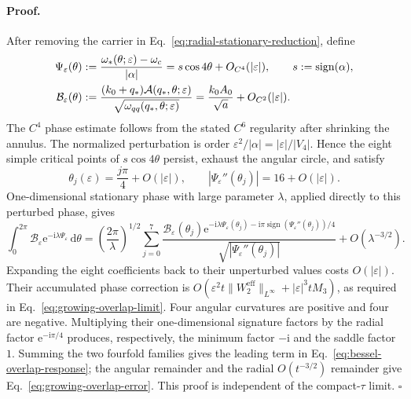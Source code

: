 \paragraph{Proof.}
After removing the carrier in
Eq.~\eqref{eq:radial-stationary-reduction}, define
\begin{align}
  \Psi_\varepsilon(\theta)
  &:=\frac{\omega_*(\theta;\varepsilon)-\omega_c}{|\alpha|}
    =s\cos4\theta+O_{C^4}(|\varepsilon|),
    \qquad s:=\operatorname{sign}(\alpha),                         \notag\\
  \mathcal B_\varepsilon(\theta)
  &:=\frac{(k_0+q_*)\mathcal A(q_*,\theta;\varepsilon)}
          {\sqrt{\omega_{qq}(q_*,\theta;\varepsilon)}}
    =\frac{k_0A_0}{\sqrt a}+O_{C^2}(|\varepsilon|).
  \label{eq:growing-overlap-normalized-data}
\end{align}
The \(C^4\) phase estimate follows from the stated \(C^6\) regularity after
shrinking the annulus.  The normalized perturbation is order
\(\varepsilon^2/|\alpha|=|\varepsilon|/|V_4|\).  Hence the eight simple
critical points of \(s\cos4\theta\) persist, exhaust the angular circle,
and satisfy
\begin{equation}
  \theta_j(\varepsilon)=\frac{j\pi}{4}+O(|\varepsilon|),
  \qquad
  |\Psi_\varepsilon''(\theta_j)|=16+O(|\varepsilon|).
  \label{eq:growing-overlap-critical-data}
\end{equation}
One-dimensional stationary phase with large parameter \(\lambda\), applied
directly to this perturbed phase, gives
\begin{equation}
  \int_0^{2\pi}\mathcal B_\varepsilon
    \mathrm e^{-\mathrm i\lambda\Psi_\varepsilon}\,\mathrm d\theta
  =\left(\frac{2\pi}{\lambda}\right)^{1/2}
    \sum_{j=0}^{7}
    \frac{\mathcal B_\varepsilon(\theta_j)
      \mathrm e^{-\mathrm i\lambda\Psi_\varepsilon(\theta_j)
      -\mathrm i\pi\operatorname{sign}
        (\Psi_\varepsilon''(\theta_j))/4}}
         {\sqrt{|\Psi_\varepsilon''(\theta_j)|}}
    +O(\lambda^{-3/2}).
  \label{eq:growing-angular-stationary-phase}
\end{equation}
Expanding the eight coefficients back to their unperturbed values costs
\(O(|\varepsilon|)\).  Their accumulated phase correction is
\(O(\varepsilon^2t\lVert W_2^{\mathrm{eff}}\rVert_{L^\infty}
  +|\varepsilon|^3tM_3)\), as required in
Eq.~\eqref{eq:growing-overlap-limit}.  Four angular curvatures
are positive and four are negative.  Multiplying their one-dimensional
signature factors by the radial factor \(\mathrm e^{-\mathrm i\pi/4}\)
produces, respectively, the minimum factor \(-\mathrm i\) and the saddle
factor \(1\).  Summing the two fourfold families gives the leading term in
Eq.~\eqref{eq:bessel-overlap-response}; the angular remainder and the
radial \(O(t^{-3/2})\) remainder give
Eq.~\eqref{eq:growing-overlap-error}.  This proof is independent of the
compact-\(\tau\) limit. \(\square\)

